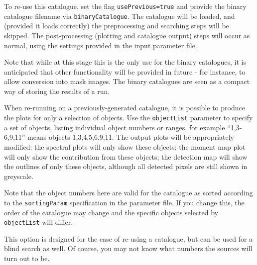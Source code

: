 To re-use this catalogue, set the flag \texttt{usePrevious=true} and
provide the binary catalogue filename via
\texttt{binaryCatalogue}. The catalogue will be loaded, and (provided
it loads correctly) the preprocessing and searching steps will be
skipped. The post-processing (\ie plotting and catalogue output) steps
will occur as normal, using the settings provided in the input
parameter file.

Note that while at this stage this is the only use for the binary
catalogues, it is anticipated that other functionality will be
provided in future - for instance, to allow conversion into mask
images. The binary catalogues are seen as a compact way of storing the
results of a \duchamp run. 


When re-running \duchamp on a previously-generated catalogue, it is
possible to produce the plots for only a selection of objects. Use the
\texttt{objectList} parameter to specify a set of objects, listing
individual object numbers or ranges, for example ``1,3-6,9,11'' means
objects 1,3,4,5,6,9,11. The output plots will be appropriately
modified: the spectral plots will only show these objects; the moment
map plot will only show the contribution from these objects; the
detection map will show the outlines of only these objects, although
all detected pixels are still shown in greyscale. 

Note that the object numbers here are valid for the catalogue as
sorted according to the \texttt{sortingParam} specification in the
parameter file. If you change this, the order of the catalogue may
change and the specific objects selected by \texttt{objectList} will
differ. 

This option is designed for the case of re-using a catalogue, but can
be used for a blind search as well. Of course, you may not know what
numbers the sources will turn out to be.

